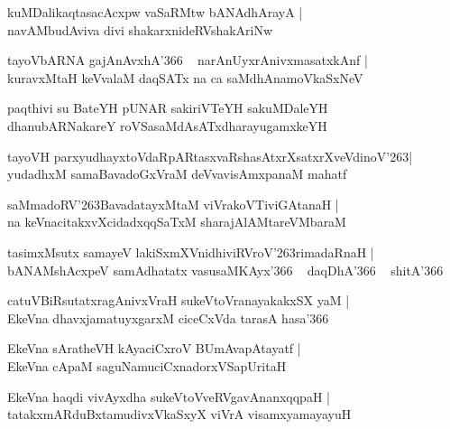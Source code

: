 \documentclass[twoside,12pt,openright]{book}
\def\S{\char'263}
\newcounter{shloka}[chapter]
\begin{document}
\begin{shloka}%
kuMDalikaqtasacAcxpw vaSaRMtw bANAdhArayA |\\
navAMbudAviva divi shakarxnideRVshakAriNw
\end{shloka}

\begin{shloka}%
tayoVbARNA gajAnAvxhA\char'366 ~ narAnUyxrAnivxmasatxkAnf |\\
kuravxMtaH keVvalaM daqSATx na ca saMdhAnamoVkaSxNeV 
\end{shloka}

\begin{shloka}%
paqthivi su BateYH pUNAR sakiriVTeYH sakuMDaleYH \\
dhanubARNakareY roVSasaMdAsATxdharayugamxkeYH
\end{shloka}

\begin{shloka}%
tayoVH parxyudhayxtoVdaRpARtasxvaRshasAtxrXsatxrXveVdinoV\S |\\
yudadhxM samaBavadoGxVraM deVvavisAmxpanaM mahatf 
\end{shloka}

\begin{shloka}%
saMmadoRV\S BavadatayxMtaM viVrakoVTiviGAtanaH |\\
na keVnacitakxvXcidadxqqSaTxM sharajAlAMtareVMbaraM 
\end{shloka}

\begin{shloka}%
tasimxMsutx samayeV lakiSxmXVnidhiviRVroV\S rimadaRnaH |\\
bANAMshAcxpeV samAdhatatx vasusaMKAyx\char'366 ~ daqDhA\char'366 ~ shitA\char'366
\end{shloka}

\begin{shloka}%
catuVBiRsutatxragAnivxVraH sukeVtoVranayakakxSX yaM |\\
EkeVna dhavxjamatuyxgarxM ciceCxVda tarasA hasa\char'366 
\end{shloka}

\begin{shloka}%
EkeVna sAratheVH kAyaciCxroV BUmAvapAtayatf |\\
EkeVna cApaM saguNamuciCxnadorxVSapUritaH
\end{shloka}

\begin{shloka}%
EkeVna haqdi vivAyxdha sukeVtoVveRVgavAnanxqqpaH |\\
tatakxmARduBxtamudivxVkaSxyX viVrA visamxyamayayuH 
\end{shloka}
\end{document}

